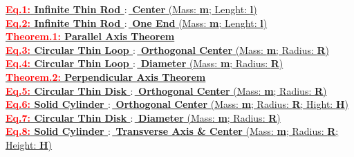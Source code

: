 \documentclass[12pt]{scrartcl}
\begin{document}
\newpage

\hyperlink{N1}{\selectfont
	\noindent \textbf{\textcolor{red}{Eq.1:} Infinite Thin Rod $:$ Center }(Mass: \textbf{m}; Lenght: \textbf{l})
}\\

\hyperlink{N2}{\selectfont
	\noindent \textbf{\textcolor{red}{Eq.2:} Infinite Thin Rod $:$ One End }(Mass: \textbf{m}; Lenght: \textbf{l})
}\\

\hyperlink{N3}{\selectfont
	\noindent \textbf{\textcolor{red}{Theorem.1:} Parallel Axis Theorem}
}\\

\hyperlink{N4}{\selectfont
	\noindent \textbf{\textcolor{red}{Eq.3:} Circular Thin Loop $:$ Orthogonal Center} (Mass: \textbf{m}; Radius: \textbf{R})
}\\

\hyperlink{N5}{\selectfont
	\noindent \textbf{\textcolor{red}{Eq.4:} Circular Thin Loop $:$ Diameter} (Mass: \textbf{m}; Radius: \textbf{R})
}\\

\hyperlink{N6}{\selectfont
	\noindent \textbf{\textcolor{red}{Theorem.2:} Perpendicular Axis Theorem}
}\\

\hyperlink{N7}{\selectfont
	\noindent \textbf{\textcolor{red}{Eq.5:} Circular Thin Disk $:$ Orthogonal Center} (Mass: \textbf{m}; Radius: \textbf{R})
}\\

\hyperlink{N8}{\selectfont
	\noindent \textbf{\textcolor{red}{Eq.6:} Solid Cylinder $:$ Orthogonal Center} (Mass: \textbf{m}; Radius: \textbf{R}; Hight: \textbf{H})
}\\

\hyperlink{N9}{\selectfont
	\noindent \textbf{\textcolor{red}{Eq.7:} Circular Thin Disk $:$ Diameter} (Mass: \textbf{m}; Radius: \textbf{R})
}\\

\hyperlink{N10}{\selectfont
	\noindent \textbf{\textcolor{red}{Eq.8:} Solid Cylinder $:$ Transverse Axis \& Center} (Mass: \textbf{m}; Radius: \textbf{R}; Height: \textbf{H})
}\\
\end{document}

